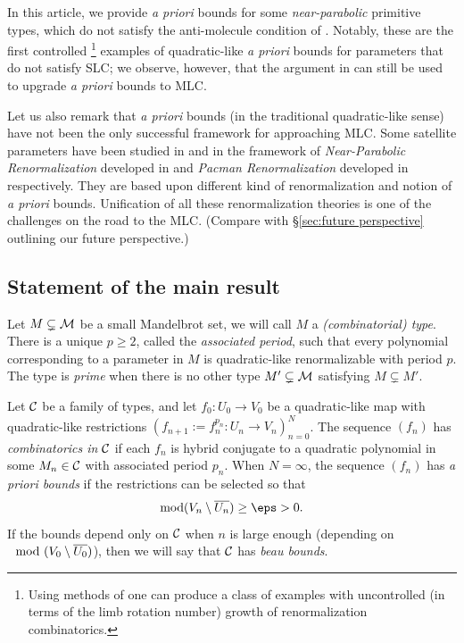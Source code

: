 \documentclass[12pt]{amsart}
\begin{document}
In this article, we provide {\textit{a priori}}  bounds for some \textit{near-parabolic} primitive types, which do not satisfy the anti-molecule condition of \cite{KL:molecules}.
Notably, these are the first {controlled}%
\footnote
 {{Using methods of \cite{lyubich1997dynamics} one can produce a class of examples with uncontrolled
 (in terms of the limb rotation number) growth of renormalization combinatorics.}}
examples of {quadratic-like} \emph{a priori} bounds for parameters that do not satisfy {SLC};
we observe, {however},  that the argument in \cite{lyubich1997dynamics} can still be used to upgrade  \textit{a priori} bounds to MLC.

Let us also remark that  \textit{a priori} bounds
(in the traditional quadratic-like sense)
 {have} not been 
the only successful framework for approaching MLC. %
Some {satellite parameters}  
have been studied in \cite{CS_satellite} and \cite{DL_pacmen} in the framework of  
 \textit{Near-Parabolic Renormalization} developed in \cite{IS} 
and 
\textit{Pacman Renormalization} developed  in \cite{DLS_pacman} respectively.
They are based upon different kind of renormalization and notion of {\em a priori} bounds.
Unification of all these renormalization theories is one of the
challenges on the road to the MLC.
(Compare with \S \ref{sec:future perspective} outlining our future perspective.)

\subsection{Statement of the main result}


Let $M\subsetneq \mathcal M$ be a small Mandelbrot set, we will call $M$ a \textit{(combinatorial) type}. There is a unique $p\geq 2$, called the \textit{associated period}, such that every polynomial corresponding to a parameter in $M$ is quadratic-like renormalizable with period $p$. The type is \textit{prime}  when there is no other type $M'\subsetneq \mathcal M$ satisfying $M\subsetneq M'$. 



Let $\mathcal C$ be a family of types, and let $f_0:U_0\to V_0$ be a quadratic-like map with quadratic-like restrictions $(f_{n+1}:= f_n^{p_n}: U_n\to V_n)_{n=0}^N$. The sequence $(f_n)$ has \textit{combinatorics in $\mathcal C$} if each $f_n$ is hybrid conjugate to a quadratic polynomial in some $M_n\in \mathcal C$ with associated period $p_n$. When $N= \infty$, the sequence $(f_n)$ has \textit{a priori bounds}  if the restrictions can be selected so that 
$$\mmod(V_n\sm \overline{U_n})\geq \eps >0.$$
If the bounds depend only on $\mathcal C$ when $n$ is large enough {(depending on $\mod (V_0 \setminus \overline {U_0} )$),} 
then we will say that $\mathcal C$ has \textit{beau bounds}.
\end{document}
